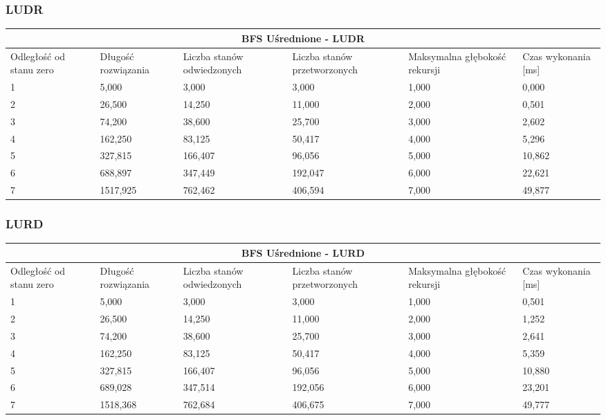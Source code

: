 \documentclass{classrep}
\begin{document}
{\subsubsection{LUDR}
\begin{center}
	\begin{tabular}{ | p{1.6cm} | p{1.4cm} | p{1.8cm} | p{2cm} | p{2.2cm} | p{2cm} | }
	\hline
	\multicolumn{6}{|c|}{BFS Uśrednione - LUDR} \\
	\hline
	Odległość od stanu zero & Długość rozwiązania & Liczba stanów odwiedzonych & Liczba stanów przetworzonych & Maksymalna głębokość rekursji & Czas wykonania [ms]\\
	\hline
	1&5,000&3,000&3,000&1,000&0,000 \\
	\hline
	2&26,500&14,250&11,000&2,000&0,501 \\
	\hline
	3&74,200&38,600&25,700&3,000&2,602 \\
	\hline
	4&162,250&83,125&50,417&4,000&5,296 \\
	\hline
	5&327,815&166,407&96,056&5,000&10,862 \\
	\hline
	6&688,897&347,449&192,047&6,000&22,621 \\
	\hline
	7&1517,925&762,462&406,594&7,000&49,877 \\
	\hline
	\end{tabular}
\end{center}

\subsubsection{LURD}
\begin{center}
	\begin{tabular}{ | p{1.6cm} | p{1.4cm} | p{1.8cm} | p{2cm} | p{2.2cm} | p{2cm} | }
	\hline
	\multicolumn{6}{|c|}{BFS Uśrednione - LURD} \\
	\hline
	Odległość od stanu zero & Długość rozwiązania & Liczba stanów odwiedzonych & Liczba stanów przetworzonych & Maksymalna głębokość rekursji & Czas wykonania [ms]\\
	\hline
	1&5,000&3,000&3,000&1,000&0,501 \\
	\hline
	2&26,500&14,250&11,000&2,000&1,252 \\
	\hline
	3&74,200&38,600&25,700&3,000&2,641\\
	\hline
	4&162,250&83,125	&50,417&4,000&5,359\\
	\hline
	5&327,815&166,407&96,056&5,000&10,880\\
	\hline
	6&689,028&347,514&192,056&6,000&23,201\\
	\hline
	7&1518,368&762,684&406,675&7,000&49,777\\
	\hline
	\end{tabular}
\end{center}

}
\end{document}
